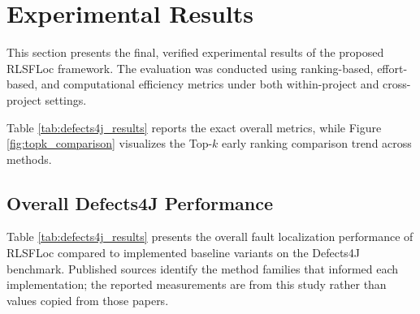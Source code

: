\documentclass[article,article,submit,pdftex,moreauthors]{Definitions/mdpi}
\begin{document}
\section{Experimental Results}
\label{sec:results}

This section presents the final, verified experimental results of the proposed RLSFLoc framework. The evaluation was conducted using ranking-based, effort-based, and computational efficiency metrics under both within-project and cross-project settings.

Table \ref{tab:defects4j_results} reports the exact overall metrics, while Figure \ref{fig:topk_comparison} visualizes the Top-$k$ early ranking comparison trend across methods.

\subsection{Overall Defects4J Performance}

Table \ref{tab:defects4j_results} presents the overall fault localization performance of RLSFLoc compared to implemented baseline variants on the Defects4J benchmark. Published sources identify the method families that informed each implementation; the reported measurements are from this study rather than values copied from those papers.

\begin{table}[H]
\caption{Overall Fault Localization Performance on Defects4J}
\label{tab:defects4j_results}
\centering
\renewcommand{\arraystretch}{1.15}
\end{table}
\end{document}
